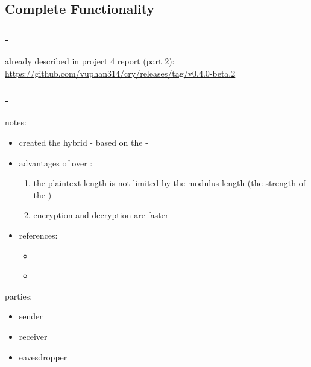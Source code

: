 \subsection{Complete Functionality}


\subsubsection{\rsa-\cs}

already described in project 4 report (part 2):
\url{https://github.com/vuphan314/cry/releases/tag/v0.4.0-beta.2}


\subsubsection{\dummy-\cs}

notes:
\begin{itemize}
\item \tc{} created the hybrid \dummy-\cs{}
  based on the \rsa-\cs
\item advantages of \dummy{} over \rsa:
  \begin{enumerate}
  \item the plaintext length is not limited by
    the modulus length (the strength of the \cs)
  \item encryption and decryption are faster
  \end{enumerate}
\item references:
  \begin{itemize}
  \item \cite{Hybrid_cryptosystem}
  \item \cite{RSA}
  \end{itemize}
\end{itemize}

\cryptos{} parties:
\begin{itemize}
\item sender
\item receiver
\item eavesdropper
\end{itemize}

